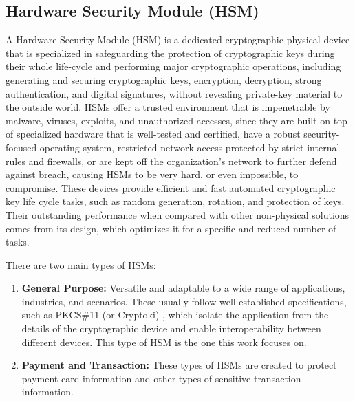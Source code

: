 \documentclass[runningheads]{llncs}
\begin{document}
\subsection{Hardware Security Module (HSM)} \label{subsec:hsm}

A Hardware Security Module (HSM) \cite{hsmdefinition} is a dedicated cryptographic physical device that is specialized in safeguarding the protection of cryptographic keys during their whole life-cycle and performing major cryptographic operations, including generating and securing cryptographic keys, encryption, decryption, strong authentication, and digital signatures, without revealing private-key material to the outside world. HSMs offer a trusted environment that is impenetrable by malware, viruses, exploits, and unauthorized accesses, since they are built on top of specialized hardware that is well-tested and certified, have a robust security-focused operating system, restricted network access protected by strict internal rules and firewalls, or are kept off the organization's network to further defend against breach, causing HSMs to be very hard, or even impossible, to compromise. These devices provide efficient and fast automated cryptographic key life cycle tasks, such as random generation, rotation, and protection of keys. Their outstanding performance when compared with other non-physical solutions comes from its design, which optimizes it for a specific and reduced number of tasks.

There are two main types of HSMs:
\begin{enumerate}
    \item \textbf{General Purpose:} Versatile and adaptable to a wide range of applications, industries, and scenarios. These usually follow well established specifications, such as PKCS\#11 (or Cryptoki) \cite{pkcs11spec}, which isolate the application from the details of the cryptographic device and enable interoperability between different devices. This type of HSM is the one this work focuses on.
    \item \textbf{Payment and Transaction:} These types of HSMs are created to protect payment card information and other types of sensitive transaction information.
\end{enumerate}
\end{document}
